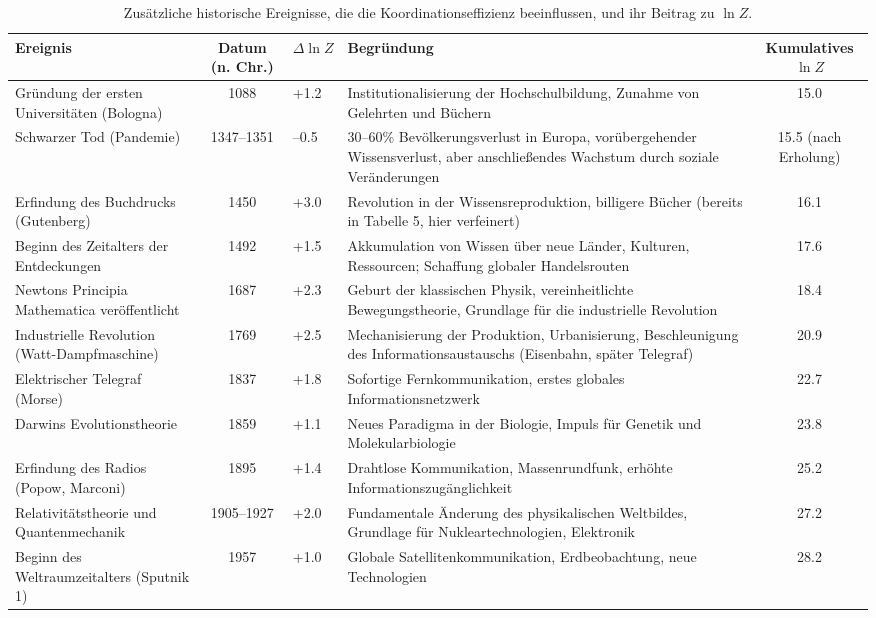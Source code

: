 \documentclass[12pt,a4paper]{article}
\theoremstyle{remark}
\begin{document}
	\begin{table}[htbp]
		\centering
		\caption{Zusätzliche historische Ereignisse, die die Koordinationseffizienz beeinflussen, und ihr Beitrag zu $\ln Z$.}
		\label{tab:expanded-events}
		\scriptsize  
		\begin{tabular}{p{3.2cm} c p{2.5cm} p{4.5cm} c}
			\toprule
			\textbf{Ereignis} & \textbf{Datum (n. Chr.)} & \textbf{$\Delta \ln Z$} & \textbf{Begründung} & \textbf{Kumulatives $\ln Z$} \\
			\midrule
			Gründung der ersten Universitäten (Bologna) & 1088 & +1.2 & Institutionalisierung der Hochschulbildung, Zunahme von Gelehrten und Büchern & 15.0 \\
			Schwarzer Tod (Pandemie) & 1347–1351 & –0.5 & 30–60\% Bevölkerungsverlust in Europa, vorübergehender Wissensverlust, aber anschließendes Wachstum durch soziale Veränderungen & 15.5 (nach Erholung) \\
			Erfindung des Buchdrucks (Gutenberg) & 1450 & +3.0 & Revolution in der Wissensreproduktion, billigere Bücher (bereits in Tabelle 5, hier verfeinert) & 16.1 \\
			Beginn des Zeitalters der Entdeckungen & 1492 & +1.5 & Akkumulation von Wissen über neue Länder, Kulturen, Ressourcen; Schaffung globaler Handelsrouten & 17.6 \\
			Newtons Principia Mathematica veröffentlicht & 1687 & +2.3 & Geburt der klassischen Physik, vereinheitlichte Bewegungstheorie, Grundlage für die industrielle Revolution & 18.4 \\
			Industrielle Revolution (Watt-Dampfmaschine) & 1769 & +2.5 & Mechanisierung der Produktion, Urbanisierung, Beschleunigung des Informationsaustauschs (Eisenbahn, später Telegraf) & 20.9 \\
			Elektrischer Telegraf (Morse) & 1837 & +1.8 & Sofortige Fernkommunikation, erstes globales Informationsnetzwerk & 22.7 \\
			Darwins Evolutionstheorie & 1859 & +1.1 & Neues Paradigma in der Biologie, Impuls für Genetik und Molekularbiologie & 23.8 \\
			Erfindung des Radios (Popow, Marconi) & 1895 & +1.4 & Drahtlose Kommunikation, Massenrundfunk, erhöhte Informationszugänglichkeit & 25.2 \\
			Relativitätstheorie und Quantenmechanik & 1905–1927 & +2.0 & Fundamentale Änderung des physikalischen Weltbildes, Grundlage für Nukleartechnologien, Elektronik & 27.2 \\
			Beginn des Weltraumzeitalters (Sputnik 1) & 1957 & +1.0 & Globale Satellitenkommunikation, Erdbeobachtung, neue Technologien & 28.2 \\

\end{tabular}
\end{table}
\end{document}
